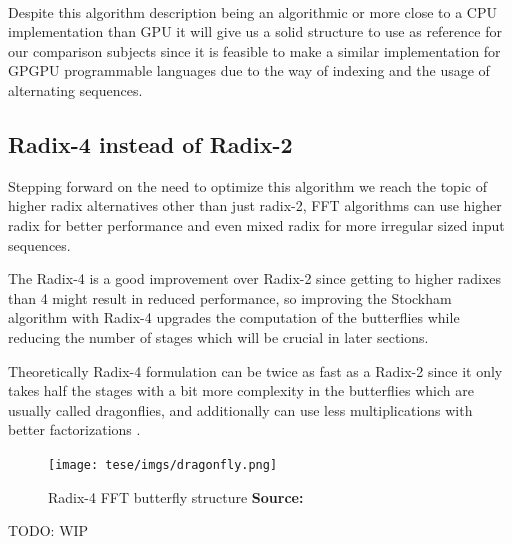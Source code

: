 \documentclass[
  oneside,
  11pt, a4paper,
  footinclude=true,
  headinclude=true,
  cleardoublepage=empty
]{scrbook}
\newcommand*{\source}[1]{%
    \textbf{Source:} \cite{#1}%
}
\begin{document}
\paragraph{}
Despite this algorithm description being an algorithmic or more close to a CPU implementation than GPU it will give us a solid structure to use as reference for our comparison subjects since it is feasible to make a similar implementation for GPGPU programmable languages due to the way of indexing and the usage of alternating sequences.

\subsection{Radix-4 instead of Radix-2}

Stepping forward on the need to optimize this algorithm we reach the topic of higher radix alternatives other than just radix-2, FFT algorithms can use higher radix for better performance and even mixed radix \cite{singleton1969algorithm} for more irregular sized input sequences.

The Radix-4 is a good improvement over Radix-2 since getting to higher radixes than 4 might result in reduced performance, so improving the Stockham algorithm with Radix-4 upgrades the computation of the butterflies while reducing the number of stages which will be crucial in later sections.

Theoretically Radix-4 formulation can be twice as fast as a Radix-2 \cite{hussain2010evaluation} since it only takes half the stages with a bit more complexity in the butterflies which are usually called dragonflies, and additionally can use less multiplications with better factorizations \cite{marti2009radix}.


\begin{figure}[h] 
    \centering
    \texttt{[image: tese/imgs/dragonfly.png]}
    \caption{Radix-4 FFT butterfly structure \source{marti2009radix}}
    \label{fig:signal-decomposition}
\end{figure}


TODO: WIP
\end{document}

